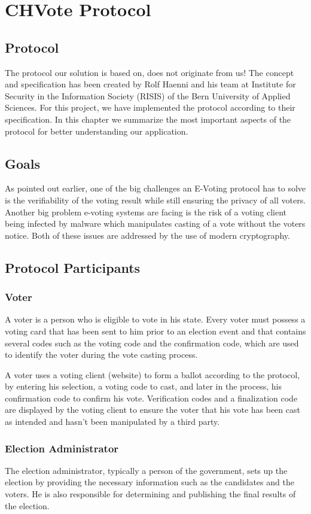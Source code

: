 \chapter{CHVote Protocol}
\section{Protocol}
The protocol our solution is based on, does not originate from us! The concept and specification has been created by Rolf Haenni and his team at Institute for Security in the Information Society (RISIS) of the Bern University of Applied Sciences. For this project, we have implemented the protocol according to their specification. In this chapter we summarize the most important aspects of the protocol for better understanding our application.

\section{Goals}
As pointed out earlier, one of the big challenges an E-Voting protocol has to solve is the verifiability of the voting result while still ensuring the privacy of all voters. Another big problem e-voting systems are facing is the risk of a voting client being infected by malware which manipulates casting of a vote without the voters notice. Both of these issues are addressed by the use of modern cryptography.

\section{Protocol Participants}
\subsection{Voter}
A voter is a person who is eligible to vote in his state. Every voter must possess a voting card that has been sent to him prior to an election event and that contains several codes such as the voting code and the confirmation code, which are used to identify the voter during the vote casting process.

A voter uses a voting client (website) to form a ballot according to the protocol, by entering his selection, a voting code to cast, and later in the process, his confirmation code to confirm his vote. Verification codes and a finalization code are displayed by the voting client to ensure the voter that his vote has been cast as intended and hasn't been manipulated by a third party.
\subsection{Election Administrator}
The election administrator, typically a person of the government, sets up the election by providing the necessary information such as the candidates and the voters. He is also responsible for determining and publishing the final results of the election.
